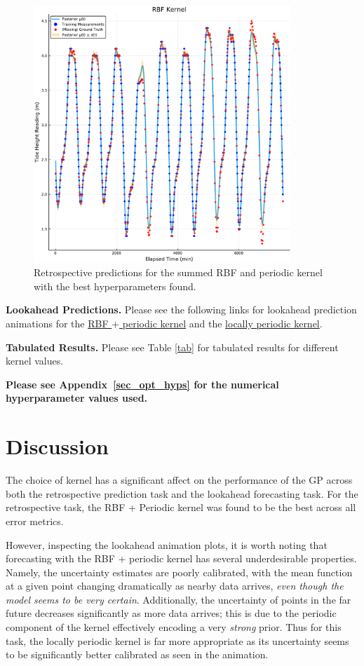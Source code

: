 \documentclass[a4paper, twocolumn, 10pt]{article}
\begin{document}
\begin{figure}[H]
	\includegraphics[width=275pt]{best}
	\centering
	\caption{Retrospective predictions for the summed RBF and periodic kernel with the best hyperparameters found.}
\end{figure}


\noindent\textbf{Lookahead Predictions.} Please see the following links for lookahead prediction animations for the  \href{https://mrinanksharma.github.io/files/aims-data/summed.gif}{RBF $+$ periodic kernel} and the \href{https://mrinanksharma.github.io/files/aims-data/local_periodic.gif}{locally periodic kernel}.

\noindent\textbf{Tabulated Results.} Please see Table \ref{tab} for tabulated results for different kernel values.

\textbf{Please see Appendix~\ref{sec_opt_hyps} for the numerical hyperparameter values used.}

\section{Discussion}
The choice of kernel has a significant affect on the performance of the GP across both the retrospective prediction task and the lookahead forecasting task. For the retrospective task, the RBF + Periodic kernel was found to be the best across all error metrics. 

However, inspecting the lookahead animation plots, it is worth noting that forecasting with the RBF + periodic kernel has several underdesirable properties. Namely, the uncertainty estimates are poorly calibrated, with the mean function at a given point changing dramatically as nearby data arrives, \emph{even though the model seems to be very certain}. Additionally, the uncertainty of points in the far future decreases significantly as more data arrives; this is due to the periodic component of the kernel effectively encoding a very \emph{strong} prior. Thus for this task, the locally periodic kernel is far more appropriate as its uncertainty seems to be significantly better calibrated as seen in the animation.
\end{document}
